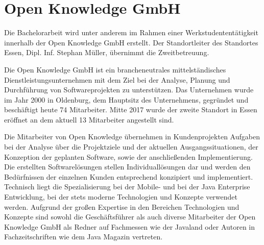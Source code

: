
\section{Open Knowledge GmbH}


Die Bachelorarbeit wird unter anderem im Rahmen einer Werkstudententätigkeit innerhalb der Open Knowledge GmbH erstellt. Der Standortleiter des Standortes Essen, Dipl. Inf. Stephan Müller, übernimmt die Zweitbetreuung.

Die Open Knowledge GmbH ist ein brancheneutrales mittelständisches Dienstleistungsunternehmen mit dem Ziel bei der Analyse, Planung und Durchführung von Softwareprojekten zu unterstützen. Das Unternehmen wurde im Jahr 2000 in Oldenburg, dem Hauptsitz des Unternehmens, gegründet und beschäftigt heute 74 Mitarbeiter. Mitte 2017 wurde der zweite Standort in Essen eröffnet an dem aktuell 13 Mitarbeiter angestellt sind.

Die Mitarbeiter von Open Knowledge übernehmen in Kundenprojekten Aufgaben bei der Analyse über die Projektziele und der aktuellen Ausgangssituationen, der Konzeption der geplanten Software, sowie der anschließenden Implementierung. Die erstellten Softwarelösungen stellen Individuallösungen dar und werden den Bedürfnissen der einzelnen Kunden entsprechend konzipiert und implementiert. Technisch liegt die Spezialisierung bei der Mobile- und bei der Java Enterprise Entwicklung, bei der stets moderne Technologien und Konzepte verwendet werden. Aufgrund der großen Expertise in den Bereichen Technologien und Konzepte sind sowohl die Geschäftsführer als auch diverse Mitarbeiter der Open Knowledge GmbH als Redner auf Fachmessen wie der Javaland oder Autoren in Fachzeitschriften wie dem Java Magazin vertreten.%

%

\pagebreak
